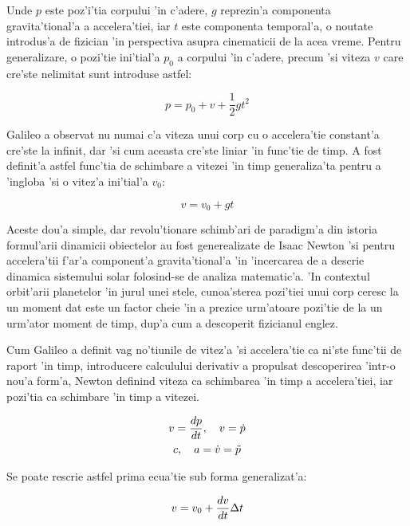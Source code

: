 \documentclass[12pt,a4paper,twoside]{report}
\begin{document}
Unde $p$ este poz'i'tia corpului 'in c'adere, $g$ reprezin'a componenta gravita'tional'a a accelera'tiei, iar $t$ este componenta temporal'a, o noutate introdus'a de fizician 'in perspectiva asupra cinematicii de la acea vreme. Pentru generalizare, o pozi'tie ini'tial'a $p_0$ a corpului 'in c'adere, precum 'si viteza $v$ care cre'ste nelimitat sunt introduse astfel:

\begin{equation}
 p = p_0 + v + \frac{1}{2}gt^2
\end{equation}

Galileo a observat nu numai c'a viteza unui corp cu o accelera'tie constant'a cre'ste la infinit, dar 'si cum aceasta cre'ste liniar 'in func'tie de timp. A fost definit'a astfel func'tia de schimbare a vitezei 'in timp generaliza'ta pentru a 'ingloba 'si o vitez'a ini'tial'a $v_0$:

\begin{equation}
 v = v_0 + gt
\end{equation}

Aceste dou'a simple, dar revolu'tionare schimb'ari de paradigm'a din istoria formul'arii dinamicii obiectelor au fost generealizate de Isaac Newton 'si pentru accelera'tii f'ar'a component'a gravita'tional'a 'in 'incercarea de a descrie dinamica sistemului solar folosind-se de analiza matematic'a. 'In contextul orbit'arii planetelor 'in jurul unei stele, cunoa'sterea pozi'tiei  unui corp ceresc la un moment dat este un factor cheie 'in a prezice urm'atoare pozi'tie de la un urm'ator moment de timp, dup'a cum a descoperit fizicianul englez.  

Cum Galileo a definit vag no'tiunile de vitez'a 'si accelera'tie ca ni'ste func'tii de raport 'in timp, introducere calculului derivativ a propulsat descoperirea 'intr-o nou'a form'a, Newton definind viteza ca schimbarea 'in timp a accelera'tiei, iar pozi'tia ca schimbare 'in timp a vitezei.

\begin{gather}
 v = \frac{dp}{dt}, \hspace{10px} v = \dot p \\
 c, \hspace{10px} a = \dot v = \ddot p 
\end{gather}

Se poate rescrie astfel prima ecua'tie sub forma generalizat'a:

\begin{equation}
  v = v_0 + \frac{dv}{dt} \Delta t  \\
\end{equation}
\end{document}
